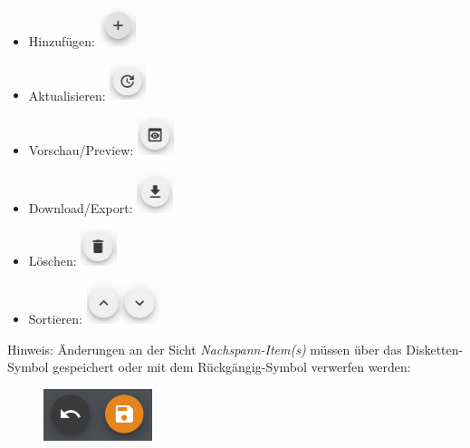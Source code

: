 \documentclass[
  letterpaper,
  DIV=11]{scrreprt}
\providecommand{\tightlist}{%
  \setlength{\itemsep}{0pt}\setlength{\parskip}{0pt}}\usepackage{longtable,booktabs,array}
\begin{document}
\begin{tcolorbox}
\begin{itemize}
\tightlist
\item
  Hinzufügen:
  \includegraphics[width=0.41667in,height=\textheight]{img/screenshot-add-project-plus-icon.png}
\item
  Aktualisieren:
  \includegraphics[width=0.41667in,height=\textheight]{img/screenshot-update-item-icon-01.png}
\item
  Vorschau/Preview:
  \includegraphics[width=0.41667in,height=\textheight]{img/screenshot-preview-icon-01.png}
\item
  Download/Export:
  \includegraphics[width=0.41667in,height=\textheight]{img/screenshot-download-item-icon-01.png}
\item
  Löschen:
  \includegraphics[width=0.41667in,height=\textheight]{img/screenshot-delete-item-icon-01.png}
\item
  Sortieren:
  \includegraphics[width=0.83333in,height=\textheight]{img/screenshot-sort-items-icon-01.png}
\end{itemize}

Hinweis: Änderungen an der Sicht \emph{Nachspann-Item(s)} müssen über
das Disketten-Symbol gespeichert oder mit dem Rückgängig-Symbol
verwerfen werden:

\begin{figure}[H]

\includegraphics[width=1.25in,height=\textheight]{img/screenshot-icons-undo-and-save-01.png} \hfill{}

\end{figure}

\end{tcolorbox}
\end{document}
